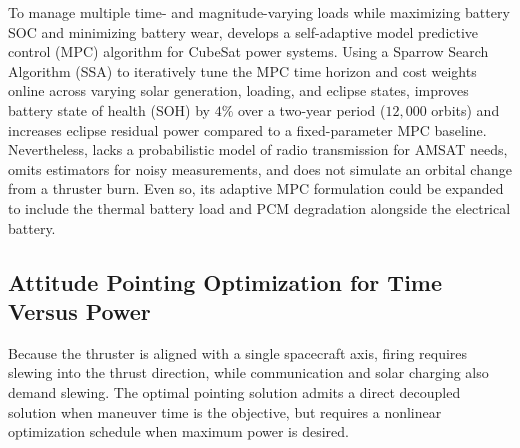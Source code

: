 To manage multiple time- and magnitude-varying loads while maximizing battery SOC and minimizing battery wear, \cite{akarneSelfAdaptiveEnergyAwarePower2026} develops a self-adaptive model predictive control (MPC) algorithm for CubeSat power systems. Using a Sparrow Search Algorithm (SSA) to iteratively tune the MPC time horizon and cost weights online across varying solar generation, loading, and eclipse states, \cite{akarneSelfAdaptiveEnergyAwarePower2026} improves battery state of health (SOH) by $4\%$ over a two-year period ($12,000$ orbits) and increases eclipse residual power compared to a fixed-parameter MPC baseline. Nevertheless, \cite{akarneSelfAdaptiveEnergyAwarePower2026} lacks a probabilistic model of radio transmission for AMSAT needs, omits estimators for noisy measurements, and does not simulate an orbital change from a thruster burn. Even so, its adaptive MPC formulation could be expanded to include the thermal battery load and PCM degradation alongside the electrical battery.

\subsection{Attitude Pointing Optimization for Time Versus Power}

Because the thruster is aligned with a single spacecraft axis, firing requires slewing into the thrust direction, while communication and solar charging also demand slewing. The optimal pointing solution admits a direct decoupled solution when maneuver time is the objective, but requires a nonlinear optimization schedule when maximum power is desired.

